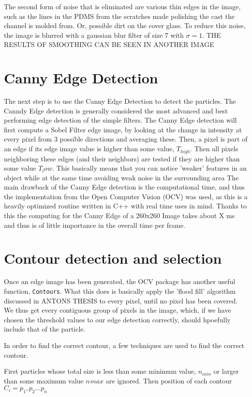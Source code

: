 \documentclass[]{report}
\begin{document}
The second form of noise that is eliminated are various thin edges in the image, such as the lines in the PDMS
from the scratches made polishing the cast the channel is molded from. Or, possible dirt on the cover glass. To reduce this noise, the image is blurred with a gaussian blur filter of size 7 with $\sigma=1$. THE RESULTS OF SMOOTHING CAN BE SEEN IN ANOTHER IMAGE
\section{Canny Edge Detection}
The next step is to use the Canny Edge Detection to detect the particles. The Canndy Edge detection is generally considered the most advanced and best performing edge detection of the simple filters. The Canny Edge detection will first compute a Sobel Filter edge image, by looking at the change in intensity at every pixel from 3 possible directions and averaging these. Then, a pixel is part of an edge if its edge image value is higher than some value, $T_{high}$. Then all pixels neighboring these edges (and their neighbors) are tested if they are higher than some value $T_low$. This basically means that you can notice 'weaker' features in an object while at the same time avoiding weak noise in the surrounding area  The main drawback of the Canny Edge detection is the computational time, and thus the implementation from the Open Computer Vision (OCV) was used, as this is a heavily optimized routine written in C++ with real time uses in mind. Thanks to this the computing for the Canny Edge of a 260x260 Image takes about X ms and thus is of little importance in the overall time per frame.

\section{Contour detection and selection}
Once an edge image has been generated, the OCV package has another useful function, \texttt{Contours}. What this does is basically apply the 'flood fill' algorithm discussed in ANTONS THESIS to every pixel, until no pixel has been covered. We thus get every contiguous group of pixels in the image, which, if we have chosen the threshold values to our edge detection correctly, should hpoefully include that of the particle. 

In order to find the correct contour, a few techniques are used to find the correct contour.

First particles whose total size is less than some minimum value, $ n_{min}$ or larger than some maximum value $n_{}max$ are ignored. Then position of each contour $C_i={p_1,p_2...p_n}$
\end{document}
